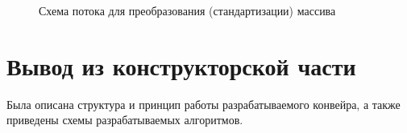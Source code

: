 \newpage
\begin{figure}[h!]
	
	
	\caption{Схема потока для преобразования (стандартизации) массива}
	
	\label{fig:paral_transformer}
	
\end{figure}

\newpage
\section{Вывод из конструкторской части}

Была описана структура и принцип работы разрабатываемого конвейра, а также приведены схемы разрабатываемых алгоритмов.


